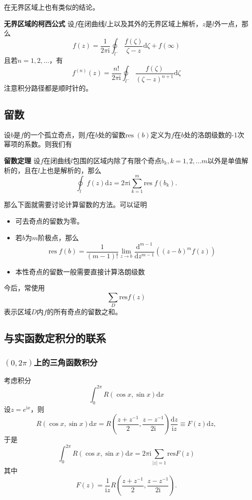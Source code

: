 \documentclass[UTF8]{ctexart}
\newcommand*{\res}{\mathrm{res}\;}
\begin{document}
在无界区域上也有类似的结论。

\textbf{无界区域的柯西公式}
设$f$在闭曲线$l$上以及其外的无界区域上解析，$z$是$l$外一点，那么
\[
f(z) = \frac{1}{2\pi \mathrm{i}} \oint_{l^-} \frac{f(\zeta)}{\zeta - z} \mathrm{d}\zeta + f(\infty  )
\] 且若$n=1, 2, \ldots$，有 \[
f^{(n)}(z) = \frac{n!}{2 \pi \mathrm{i}} \oint_{l^-} \frac{f(\zeta)}{(\zeta - z)^{n+1}}\mathrm{d}\zeta
\] 注意积分路径都是顺时针的。

\subsection{留数}

设$b$是$f$的一个孤立奇点，则$f$在$b$处的留数$\res (b)$定义为$f$在$b$处的洛朗级数的-1次幂项的系数。则我们有

\textbf{留数定理}
设$f$在闭曲线$l$包围的区域内除了有限个奇点$b_k, k=1, 2, \ldots m$以外是单值解析的，且在$l$上也是解析的，那么
\[
\oint_l f(z) \mathrm{d}z = 2 \pi \mathrm{i} \sum_{k=1}^m \res f(b_k).
\]

那么下面就需要讨论计算留数的方法。可以证明

\begin{itemize}
\item
  可去奇点的留数为零。
\item
  若$b$为$m$阶极点，那么 \[
  \res f(b) = \frac{1}{(m-1)!} \lim_{z \to b} \frac{\mathrm{d}^{m-1}}{\mathrm{d} z^{m-1}} \left( (z-b)^m f(z) \right)
  \]
\item
  本性奇点的留数一般需要直接计算洛朗级数
\end{itemize}

今后，常使用 
\[
\sum_D \mathrm{res} f(z)
\] 
表示区域$D$内$f$的所有奇点的留数之和。

\subsection{与实函数定积分的联系}

\subsubsection{\texorpdfstring{$(0, 2\pi)$上的三角函数积分}{(0, 2\textbackslash{}pi)上的三角函数积分}}

考虑积分 \[
\int_0^{2\pi} R(\cos x, \sin x) \mathrm{d}x
\] 设$z=e^{\mathrm{i}x}$，则 \[
R(\cos x, \sin x) \mathrm{d}x = R \left(\frac{z + z^{-1}}{2}, \frac{z - z^{-1}}{2 \mathrm{i}}\right) \frac{\mathrm{d} z}{\mathrm{i}z} \equiv F(z) \mathrm{d}z,
\] 于是 \[
\int_0^{2\pi} R(\cos x, \sin x) \mathrm{d}x = 2 \pi \mathrm{i} \sum_{|z|=1} \mathrm{res} F(z)
\] 其中 \[
F(z) = \frac{1}{\mathrm{i}z} R \left(\frac{z + z^{-1}}{2}, \frac{z - z^{-1}}{2 \mathrm{i}}\right).
\]
\end{document}
